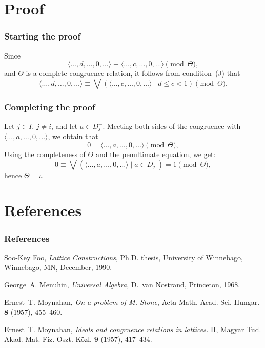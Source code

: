 \documentclass{beamer}
\begin{document}
\section{Proof}

\begin{frame}
\frametitle{Starting the proof}

Since 
\begin{equation*}
\langle \ldots, d, \ldots, 0, \ldots \rangle \equiv 
\langle \ldots, c, \ldots, 0, \ldots \rangle 
\pmod{\Theta}, 
\end{equation*}
and $\Theta$ is a complete congruence relation, 
it follows from condition~(J) that
\begin{equation*}
 \langle \ldots, d, \ldots, 0, \ldots \rangle \equiv
 \bigvee ( \langle \ldots, c, \ldots, 0, \ldots \rangle 
 \mid d \leq c < 1 ) \pmod{\Theta}. 
\end{equation*}
\end{frame}

\begin{frame}
\frametitle{Completing the proof}

Let $j \in I$, $j \neq i$, and let $a \in D_{j}^{-}$. 
Meeting both sides of the congruence 
with $\langle \ldots, a, \ldots, 0, \ldots \rangle$, 
we obtain that
\begin{equation*}
   0 = \langle \ldots, a, \ldots, 0, \ldots \rangle 
     \pmod{\Theta}, 
\end{equation*}
Using the completeness of $\Theta$ and the penultimate equation, 
we get:
\[
   0 \equiv \bigvee ( \langle \ldots, a, \ldots, 0, 
     \ldots \rangle \mid a \in D_{j}^{-} ) = 1 
     \pmod{\Theta}, 
\]
hence $\Theta = \iota$.
\end{frame}

\section{References}

\begin{frame}
\frametitle{References}

\begin{thebibliography}{9}

Soo-Key Foo, 
\emph{Lattice Constructions}, 
Ph.D. thesis, 
University of Winnebago, Winnebago, MN, December, 1990.

George~A. Menuhin, 
\emph{Universal Algebra}, 
D.~van Nostrand, Princeton, 1968.

Ernest~T. Moynahan, 
\emph{On a problem of M. Stone},
Acta Math. Acad. Sci. Hungar. \textbf{8} (1957), 
455--460.

Ernest~T. Moynahan, 
\emph{Ideals and congruence relations in lattices.} II,
Magyar Tud. Akad. Mat. Fiz. Oszt. K\"{o}zl. \textbf{9} 
(1957), 417--434.

\end{thebibliography}
\end{frame}
\end{document}
